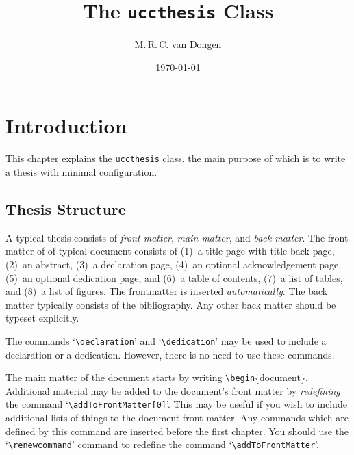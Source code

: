\documentclass[MScCS]{uccthesis}
\title{The \texttt{uccthesis} Class}
\author{M.\,R.\,C. van Dongen}
\date{\today}
\newcommand*{\COMMAND}[1]{\texttt{\textbackslash #1}}
\newcommand*{\COMMANDWITHARGUMENT}[2]{\texttt{\textbackslash #1}\{#2\}}
\begin{document}
   \chapter{Introduction}
      This chapter explains the \texttt{uccthesis} class,
       the main purpose of which is to write a thesis
       with minimal configuration.

   \section{Thesis Structure}
      A typical thesis consists of
       \emph{front matter},
       \emph{main matter}, and
       \emph{back matter}.
      The front matter of
        of typical document consists of
       (1)~a title page with title back page,
       (2)~an abstract,
       (3)~a declaration page,
       (4)~an optional acknowledgement page,
       (5)~an optional dedication page, and
       (6)~a table of contents,
       (7)~a list of tables, and
       (8)~a list of figures.
      The frontmatter is inserted \emph{automatically}.
      The back matter typically
       consists of the bibliography.
      Any other back matter should be typeset explicitly.

      The commands `\COMMAND{declaration}' and
       `\COMMAND{dedication}' may be used to
       include a declaration or a dedication.
      However, there is no need to use these commands.

      The main matter of the document
       starts by writing \COMMANDWITHARGUMENT{begin}{document}.
      Additional material may be added
       to the document's front matter by \emph{redefining} the command
       \label{addToFrontMatter}
       `\COMMAND{addToFrontMatter[0]}'.
      This may be useful if you wish to include
       additional lists of things to the document front matter.
      Any commands which are defined by this command
       are inserted before the first chapter.
      You should use the `\COMMAND{renewcommand}'
       command to redefine the command
       `\COMMAND{addToFrontMatter}'.
\end{document}
